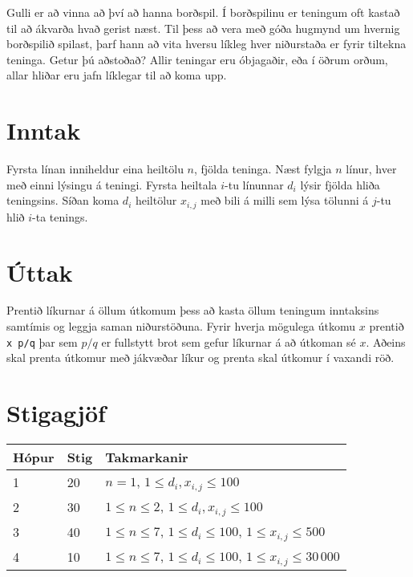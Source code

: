 
Gulli er að vinna að því að hanna borðspil. Í borðspilinu er teningum oft kastað til að ákvarða hvað gerist næst. Til þess að vera
með góða hugmynd um hvernig borðspilið spilast, þarf hann að vita hversu líkleg hver niðurstaða er fyrir tiltekna teninga. Getur
þú aðstoðað? Allir teningar eru óbjagaðir, eða í öðrum orðum, allar hliðar eru jafn líklegar til að koma upp.

\section*{Inntak}
Fyrsta línan inniheldur eina heiltölu $n$, fjölda teninga. Næst fylgja $n$ línur, hver með einni lýsingu á teningi. Fyrsta heiltala $i$-tu
línunnar $d_i$ lýsir fjölda hliða teningsins. Síðan koma $d_i$ heiltölur $x_{i,j}$ með bili á milli sem lýsa tölunni á $j$-tu hlið $i$-ta
tenings.

\section*{Úttak}
Prentið líkurnar á öllum útkomum þess að kasta öllum teningum inntaksins samtímis og leggja saman niðurstöðuna. Fyrir hverja mögulega
útkomu $x$ prentið \texttt{x p/q} þar sem $p/q$ er fullstytt brot sem gefur líkurnar á að útkoman sé $x$. Aðeins skal prenta útkomur
með jákvæðar líkur og prenta skal útkomur í vaxandi röð.

\section*{Stigagjöf}
\begin{tabular}{|l|l|l|}
\hline
Hópur & Stig & Takmarkanir \\ \hline
1     & 20   & $n = 1$, $1 \leq d_i, x_{i, j} \leq 100$ \\ \hline
2     & 30   & $1 \leq n \leq 2$, $1 \leq d_i, x_{i, j} \leq 100$ \\ \hline
3     & 40   & $1 \leq n \leq 7$, $1 \leq d_i \leq 100$, $1 \leq x_{i,j} \leq 500$ \\ \hline
4     & 10   & $1 \leq n \leq 7$, $1 \leq d_i \leq 100$, $1 \leq x_{i,j} \leq 30\,000$\\ \hline
\end{tabular}

